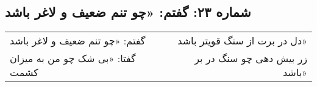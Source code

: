 \begin{center}
\section*{شماره ۲۳: گفتم: «چو تنم ضعیف و لاغر باشد}
\label{sec:023}
\begin{longtable}{l p{0.5cm} r}
گفتم: «چو تنم ضعیف و لاغر باشد
&&
دل در برت از سنگ قویتر باشد»
\\
گفتا: «بی شک چو من به میزان کشمت
&&
زر بیش دهی چو سنگ در بر باشد»
\\
\end{longtable}
\end{center}
